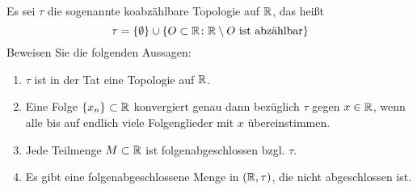\begin{exercisePage}
	
	\begin{exercise}
		Es sei $\tau$ die sogenannte koabzählbare Topologie auf $\mathbb{R}$, das heißt
		\begin{equation*}
			\tau = \left\{ \emptyset \right\} \cup \left\{ O \subset \mathbb{R} \colon \mathbb{R} \setminus O \text{ ist abzählbar} \right\}
		\end{equation*}
		Beweisen Sie die folgenden Aussagen:
		\begin{enumerate}[leftmargin=*, label=(\alph*)]
			\item  $\tau$ ist in der Tat eine Topologie auf $\mathbb{R}$.
			\item  Eine Folge $\left\{ x_n \right\}_{} \subset \mathbb{R}$ konvergiert genau dann bezüglich $\tau$ gegen $x \in \mathbb{R}$, wenn alle bis auf endlich viele Folgenglieder mit $x$ übereinstimmen.
			\item Jede Teilmenge $M \subset \mathbb{R}$ ist folgenabgeschlossen bzgl. $\tau$.
			\item Es gibt eine folgenabgeschlossene Menge in $(\mathbb{R},\tau)$, die nicht abgeschlossen ist.
		\end{enumerate}
	\end{exercise}


\end{exercisePage}

